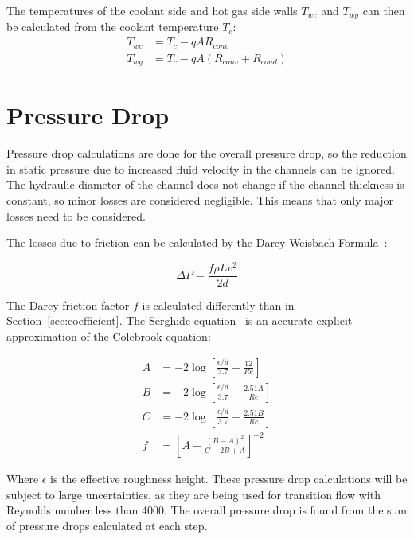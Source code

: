 \documentclass[11pt]{article}
\begin{document}
The temperatures of the coolant side and hot gas side walls $T_{wc}$ and $T_{wg}$ can then be calculated from the coolant temperature $T_c$:
\begin{align}
  T_{wc} & = T_c - q A R_{conv} \\
  T_{wg} & = T_c - q A (R_{conv} + R_{cond})
\end{align}

\section{Pressure Drop}

Pressure drop calculations are done for the overall pressure drop, so the reduction in static pressure due to increased fluid velocity in the channels can be ignored. The hydraulic diameter of the channel does not change if the channel thickness is constant, so minor losses are considered negligible. This means that only major losses need to be considered.

The losses due to friction can be calculated by the Darcy-Weisbach Formula~\cite{2009crane}:

\begin{equation}
  \Delta P = \frac{f \rho L v^2}{2d}
\end{equation}

The Darcy friction factor $f$ is calculated differently than in Section~\ref{sec:coefficient}. The Serghide equation~\cite{2009crane} is an accurate explicit approximation of the Colebrook equation:

\begin{align}
  A & = -2 \log \left[\frac{\epsilon / d}{3.7} + \frac{12}{Re} \right] \nonumber \\
  B & = -2 \log \left[ \frac{\epsilon / d}{3.7} + \frac{2.51A}{Re}\right] \nonumber \\
  C & = -2 \log \left[ \frac{\epsilon / d}{3.7} + \frac{2.51B}{Re}\right] \nonumber \\
  f & = \left[ A - \frac{(B - A)^2 }{C - 2B + A} \right]^{-2}
\end{align}

Where $\epsilon$ is the effective roughness height. These pressure drop calculations will be subject to large uncertainties, as they are being used for transition flow with Reynolds number less than 4000. The overall pressure drop is found from the sum of pressure drops calculated at each step.

\printbibliography
\end{document}
